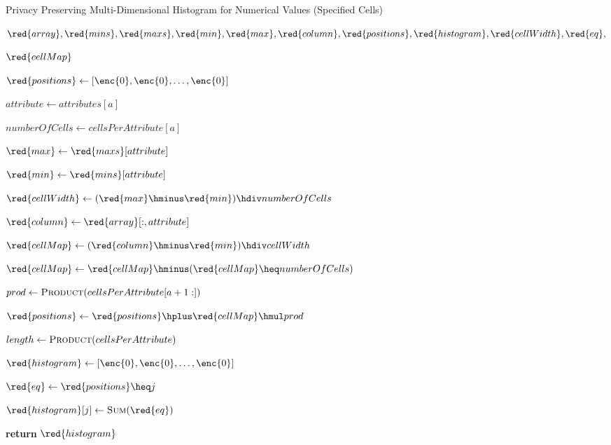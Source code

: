\begin{algorithm}[H]
\caption{Privacy Preserving Multi-Dimensional Histogram for Numerical Values (Specified Cells)}\label{a:multidim-histogram-numerical}
\begin{algorithmic}[1]
\renewcommand{\algorithmicrequire}{\textbf{Private Vars:}}
\Require $\red{array}, {\red{mins}}, {\red{maxs}}, \red{min}, \red{max}, \red{column}, \red{positions}, \red{histogram}, \red{cellWidth}, \red{eq} ,$\par
\hspace{1.2cm}$\red{cellMap}$

    \State
    $\red{positions} \gets [\enc{0}, \enc{0}, \dots, \enc{0}] $


      \State $attribute \gets attributes[a]$

      \State $numberOfCells \gets cellsPerAttribute[a]$

      \State $\red{max} \gets {\red{maxs}}[attribute]$

      \State $\red{min} \gets {\red{mins}}[attribute]$

      \State $\red{cellWidth} \gets (\red{max} \hminus \red{min}) \hdiv numberOfCells$

      \State $\red{column} \gets \red{array}[:, attribute]$

      \State $\red{cellMap} \gets (\red{column} \hminus \red{min}) \hdiv cellWidth$

      \State $\red{cellMap} \gets \red{cellMap} \hminus (\red{cellMap} \heq numberOfCells)$

      \State $prod \gets \textsc{Product}(cellsPerAttribute[a+1:])$

      \State $\red{positions} \gets \red{positions} \hplus \red{cellMap} \hmul prod$

    \EndFor

    \State $length \gets \textsc{Product}(cellsPerAttribute)$

    \State $\red{histogram} \gets [\enc{0}, \enc{0}, \dots, \enc{0}]$



      \State $\red{eq} \gets \red{positions} \heq j$

      \State $\red{histogram}[j] \gets \textsc{Sum}(\red{eq})$

    \EndFor

    \State \textbf{return} {$\red{histogram}$}
\EndProcedure


\end{algorithmic}
\end{algorithm}
